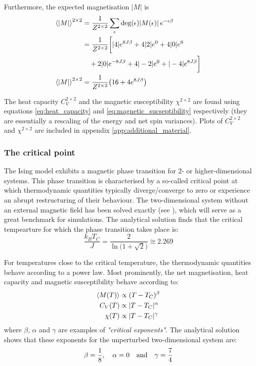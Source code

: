 \documentclass[nofootinbib,reprint,english]{revtex4-1}
\begin{document}
Furthermore, the expected magnetisation \(|M|\) is
\begin{align}
\expval{|M|}^{2\times2}&=\frac{1}{Z^{2\times2}}\sum_{\epsilon}\text{deg}(\epsilon)|M(\epsilon)|\,e^{-\epsilon\beta}\nonumber\\
&=\frac{1}{Z^{2\times2}}\bigg[|4|e^{8J\beta}+4|2|e^0+4|0|e^0\nonumber\\
&\quad+2|0|e^{-8J\beta}+4|-2|e^0+|-4|e^{8J\beta}\bigg]\nonumber\\
\expval{|M|}^{2\times2}&=\frac{1}{Z^{2\times2}}\big(16+4e^{8J\beta}\big)
\end{align}

The heat capacity \(C_V^{2\times2}\) and the magnetic susceptibility \(\chi^{2\times2}\) are found using equations \eqref{eq:heat_capacity} and \eqref{eq:magnetic_sucseptibility} respectively (they are essentially a rescaling of the energy and net spin variances). Plots of \(C_V^{2\times2}\) and \(\chi^{2\times2}\) are included in appendix \ref{app:additional_material}.
\subsubsection{The critical point}
The Ising model exhibits a magnetic phase transition for 2- or higher-dimensional systems. This phase transition is characterised by a so-called critical point at which thermodynamic quantities typically diverge/converge to zero or experience an abrupt restructuring of their behaviour. The two-dimensional system without an external magnetic field has been solved exactly (see \cite{Onsager}), which will serve as a great benchmark for simulations. The analytical solution finds that the critical tempearture for which the phase transition takes place is:
\begin{equation}
\frac{k_BT_C}{J}=\frac{2}{\ln\big(1+\sqrt{2}\big)}\cong2.269
\end{equation}

For temperatures close to the critical temperature, the thermodynamic quantities behave according to a power law. Most prominently, the net magnetisation, heat capacity and magnetic susceptibility behave according to:
\begin{subequations}\label{eq:exact_power_laws}
\begin{align}
\expval{M(T)}&\propto(T-T_C)^\beta\\
C_V(T)&\propto|T-T_C|^\alpha\\
\chi(T)&\propto|T-T_C|^\gamma
\end{align}
\end{subequations}
where \(\beta\), \(\alpha\) and \(\gamma\) are examples of \emph{"critical exponents"}. The analytical solution shows that these exponents for the unperturbed two-dimensional system are:
\[\beta=\frac{1}{8}\qc\alpha=0\qand\gamma=\frac{7}{4}\]
\end{document}
